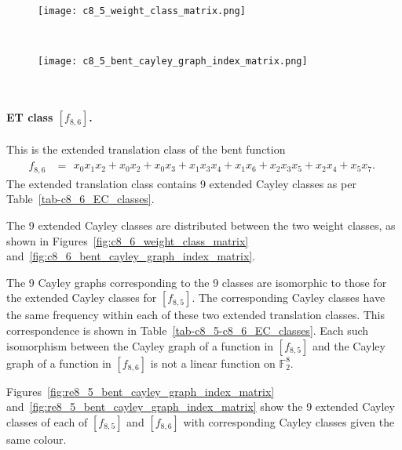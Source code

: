 \documentclass[12pt,a4paper]{article}
\newcommand{\mb}[1]{\mathbb{#1}}
\newcommand{\F}{\mb{F}}
\begin{document}
\begin{figure}[!bhpt] %
\centering
\begin{minipage}{.48\textwidth}
  \centering
  \texttt{[image: c8\_5\_weight\_class\_matrix.png]}
  \label{fig:c8_5_weight_class_matrix}
\end{minipage}%
~~~~
\begin{minipage}{.48\textwidth}
  \centering
  \texttt{[image: c8\_5\_bent\_cayley\_graph\_index\_matrix.png]}
  \label{fig:c8_5_bent_cayley_graph_index_matrix}
\end{minipage}
\end{figure}
~
\paragraph*{ET class $[f_{8,6}]$.}
%
%
This is the extended translation class of the bent function
\small{}
\begin{align*}
f_{ 8 , 6 } &=
\begin{array}{l}
x_{0} x_{1} x_{2} + x_{0} x_{2} + x_{0} x_{3} + x_{1} x_{3} x_{4} + x_{1} x_{6} + x_{2} x_{3} x_{5}
+ x_{2} x_{4} + x_{5} x_{7}.
\end{array}
\end{align*}
\normalsize{}
The extended translation class contains 9 extended Cayley classes as per Table~\ref{tab-c8_6_EC_classes}.

The 9 extended Cayley classes are distributed between the two weight classes,
as shown in Figures~\ref{fig:c8_6_weight_class_matrix} and~\ref{fig:c8_6_bent_cayley_graph_index_matrix}.

The 9 Cayley graphs corresponding to the 9 classes are isomorphic to those for the extended Cayley classes for $[f_{8,5}]$.
The corresponding Cayley classes have the same frequency within each of these two extended translation classes.
This correspondence is shown in Table~\ref{tab-c8_5-c8_6_EC_classes}.
Each such isomorphism between
the Cayley graph of a function in $[f_{8,5}]$ and
the Cayley graph of a function in $[f_{8,6}]$ is not a linear function on $\F_2^8$.

Figures~\ref{fig:re8_5_bent_cayley_graph_index_matrix} and~\ref{fig:re8_5_bent_cayley_graph_index_matrix}
show the 9 extended Cayley classes of each of $[f_{8,5}]$ and $[f_{8,6}]$ with corresponding Cayley classes
given the same colour.
\end{document}
